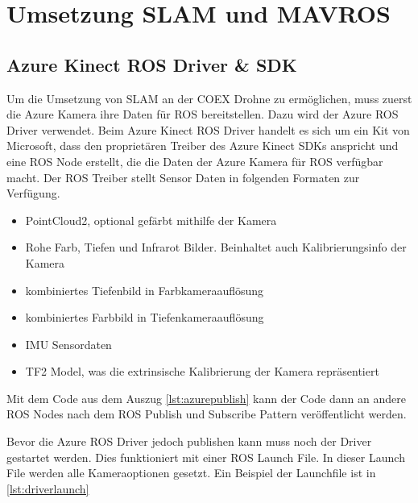 \section{Umsetzung SLAM und MAVROS} \label{slam:section}
\subsection{Azure Kinect ROS Driver \& SDK}

Um die Umsetzung von \ac{SLAM} an der COEX Drohne zu ermöglichen, muss zuerst die Azure Kamera ihre Daten für ROS bereitstellen. Dazu wird der Azure ROS Driver verwendet. Beim Azure Kinect ROS Driver handelt es sich um ein Kit von Microsoft, dass den proprietären Treiber des Azure Kinect SDKs anspricht und eine ROS Node erstellt, die die Daten der Azure Kamera für ROS verfügbar macht. Der ROS Treiber stellt Sensor Daten in folgenden Formaten zur Verfügung.

\begin{itemize}
    \item PointCloud2, optional gefärbt mithilfe der Kamera
    \item Rohe Farb, Tiefen und Infrarot Bilder. Beinhaltet auch Kalibrierungsinfo der Kamera
    \item kombiniertes Tiefenbild in Farbkameraauflösung
    \item kombiniertes Farbbild in Tiefenkameraauflösung
    \item \ac{IMU} Sensordaten
    \item \ac{TF}2 Model, was die extrinsische Kalibrierung der Kamera repräsentiert
\end{itemize}

Mit dem Code aus dem Auszug \ref{lst:azurepublish} kann der Code dann an andere \ac{ROS} Nodes nach dem \ac{ROS} Publish und Subscribe Pattern veröffentlicht werden.

Bevor die Azure ROS Driver jedoch publishen kann muss noch der Driver gestartet werden. Dies funktioniert mit einer \ac{ROS} Launch File. In dieser Launch File werden alle Kameraoptionen gesetzt. Ein Beispiel der Launchfile ist in \ref{lst:driverlaunch}
\cite[vgl. ]{kinect_ros_driver}


